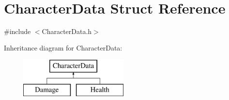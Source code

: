 \hypertarget{struct_character_data}{\section{Character\-Data Struct Reference}
\label{struct_character_data}
}


{\ttfamily \#include $<$Character\-Data.\-h$>$}

Inheritance diagram for Character\-Data\-:\begin{figure}[H]
\begin{center}
\leavevmode
\includegraphics[height=2.000000cm]{struct_character_data}
\end{center}
\end{figure}
